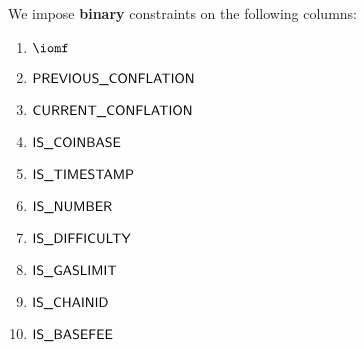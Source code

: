 We impose \textbf{binary} constraints on the following columns:
\begin{multicols}{3}
	\begin{enumerate}
		\item $\iomf$
		\item $\textsf{PREVIOUS\_CONFLATION}$
		\item $\textsf{CURRENT\_CONFLATION}$
		\item $\textsf{IS\_COINBASE}$
		\item $\textsf{IS\_TIMESTAMP}$
		\item $\textsf{IS\_NUMBER}$
		\item $\textsf{IS\_DIFFICULTY}$
		\item $\textsf{IS\_GASLIMIT}$
		\item $\textsf{IS\_CHAINID}$
		\item $\textsf{IS\_BASEFEE}$
	\end{enumerate}
\end{multicols}
